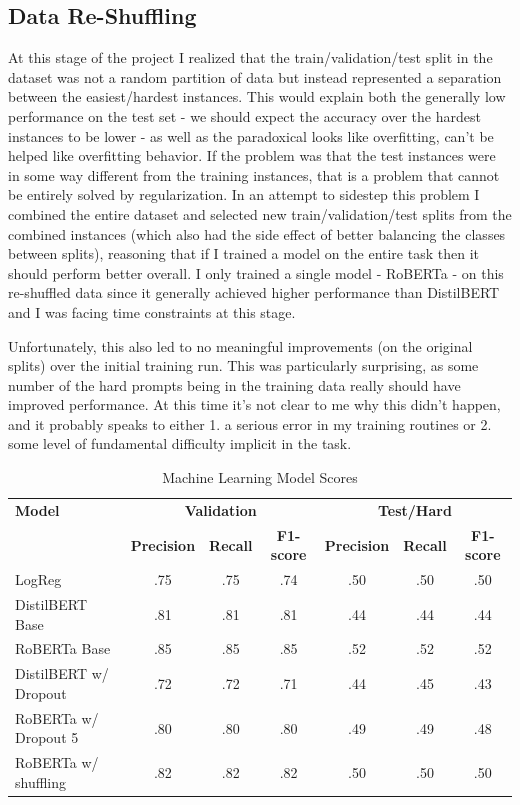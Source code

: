 \documentclass[11pt,a4paper]{article}
\begin{document}
\subsection{Data Re-Shuffling}

At this stage of the project I realized that the train/validation/test split in the dataset was not a random partition of data but instead represented a separation between the easiest/hardest instances. This would explain both the generally low performance on the test set - we should expect the accuracy over the hardest instances to be lower - as well as the paradoxical looks like overfitting, can't be helped like overfitting behavior. If the problem was that the test instances were in some way different from the training instances, that is a problem that cannot be entirely solved by regularization. In an attempt to sidestep this problem I combined the entire dataset and selected new train/validation/test splits from the combined instances (which also had the side effect of better balancing the classes between splits), reasoning that if I trained a model on the entire task then it should perform better overall. I only trained a single model - RoBERTa - on this re-shuffled data since it generally achieved higher performance than DistilBERT and I was facing time constraints at this stage.

Unfortunately, this also led to no meaningful improvements (on the original splits) over the initial training run. This was particularly surprising, as some number of the hard prompts being in the training data really should have improved performance. At this time it's not clear to me why this didn't happen, and it probably speaks to either 1. a serious error in my training routines or 2. some level of fundamental difficulty implicit in the task.


\begin{table}[t]
\centering
\caption{Machine Learning Model Scores}
\label{tab:ml_scores}
\begin{tabular}{|l|c|c|c|c|c|c|}
\hline
\textbf{Model} & \multicolumn{3}{c|}{\textbf{Validation}} & \multicolumn{3}{c|}{\textbf{Test/Hard}} \\ \cline{2-7} 
 & \textbf{Precision} & \textbf{Recall} & \textbf{F1-score} & \textbf{Precision} & \textbf{Recall} & \textbf{F1-score} \\ \hline
LogReg & .75 & .75 & .74 & .50& .50 & .50\\ \hline
DistilBERT Base & .81 & .81 & .81 & .44 & .44 & .44 \\ \hline
RoBERTa Base & .85 & .85 & .85 & .52 & .52 & .52 \\ \hline
DistilBERT w/ Dropout & .72 & .72 & .71 & .44 & .45 & .43 \\ \hline
RoBERTa w/ Dropout 5 & .80 & .80 & .80 & .49 & .49 & .48 \\ \hline
RoBERTa w/ shuffling & .82 & .82 & .82 & .50 & .50 & .50 \\ \hline
\end{tabular}
\end{table}
\end{document}
